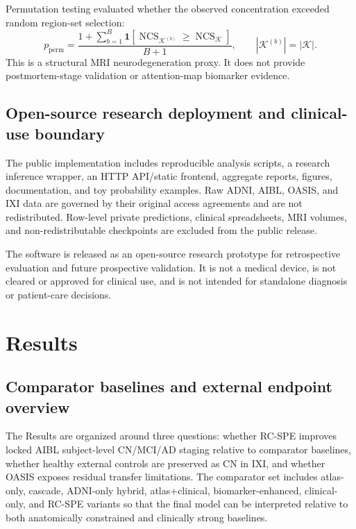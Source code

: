 Permutation testing evaluated whether the observed concentration exceeded random region-set selection:
\begin{equation}
p_{\mathrm{perm}} =
\frac{1+\sum_{b=1}^{B}
\mathbf{1}
\left[
\operatorname{NCS}_{\mathcal{K}^{(b)}}
\geq
\operatorname{NCS}_{\mathcal{K}}
\right]}
{B+1},
\qquad
|\mathcal{K}^{(b)}|=|\mathcal{K}|.
\label{eq:permutation}
\end{equation}
This is a structural MRI neurodegeneration proxy. It does not provide postmortem-stage validation or attention-map biomarker evidence.

\subsection{Open-source research deployment and clinical-use boundary}
\label{sec:deployment}

The public implementation includes reproducible analysis scripts, a research inference wrapper, an HTTP API/static frontend, aggregate reports, figures, documentation, and toy probability examples. Raw ADNI, AIBL, OASIS, and IXI data are governed by their original access agreements and are not redistributed. Row-level private predictions, clinical spreadsheets, MRI volumes, and non-redistributable checkpoints are excluded from the public release.

The software is released as an open-source research prototype for retrospective evaluation and future prospective validation. It is not a medical device, is not cleared or approved for clinical use, and is not intended for standalone diagnosis or patient-care decisions.


\section{Results}
\label{sec:results}

\subsection{Comparator baselines and external endpoint overview}
\label{sec:external_overview}

The Results are organized around three questions: whether RC-SPE improves locked AIBL subject-level CN/MCI/AD staging relative to comparator baselines, whether healthy external controls are preserved as CN in IXI, and whether OASIS exposes residual transfer limitations. The comparator set includes atlas-only, cascade, ADNI-only hybrid, atlas+clinical, biomarker-enhanced, clinical-only, and RC-SPE variants so that the final model can be interpreted relative to both anatomically constrained and clinically strong baselines.

